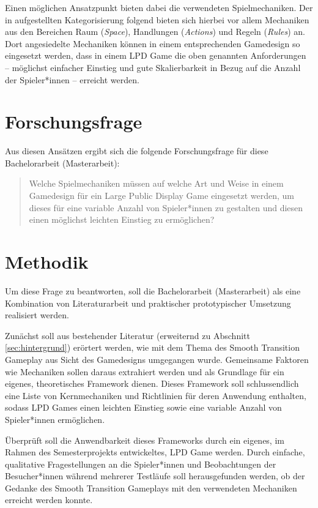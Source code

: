 Einen möglichen Ansatzpunkt bieten dabei die verwendeten Spielmechaniken. Der
in \cite{Schell2019} aufgestellten Kategorisierung folgend bieten sich hierbei 
vor allem Mechaniken aus den Bereichen Raum (\emph{Space}), Handlungen
(\emph{Actions}) und Regeln (\emph{Rules}) an. Dort angesiedelte Mechaniken
können in einem entsprechenden Gamedesign so eingesetzt werden, dass in einem
LPD Game die oben genannten Anforderungen -- möglichst einfacher Einstieg und
gute Skalierbarkeit in Bezug auf die Anzahl der Spieler*innen -- erreicht
werden.

\section{Forschungsfrage}

Aus diesen Ansätzen ergibt sich die folgende Forschungsfrage für diese
Bachelorarbeit (Masterarbeit):
%
\begin{quote}
	Welche Spielmechaniken müssen auf welche Art und Weise in einem
	Game\-design für ein Large Public Display Game eingesetzt werden, um
	dieses für eine variable Anzahl von Spieler*innen zu gestalten und diesen
	einen möglichst leichten Einstieg zu ermöglichen?
\end{quote}


\section{Methodik}

Um diese Frage zu beantworten, soll die Bachelorarbeit (Masterarbeit) als eine
Kombination von Literaturarbeit und praktischer \bzw prototypischer Umsetzung
realisiert werden.

Zunächst soll aus bestehender Literatur (erweiternd zu Abschnitt
\ref{sec:hintergrund}) erörtert werden, wie mit dem Thema des Smooth
Transition Gameplay aus Sicht des Gamedesigns umgegangen wurde. Gemeinsame
Faktoren wie Mechaniken sollen daraus extrahiert werden und als Grundlage für
ein eigenes, theoretisches Framework dienen. Dieses Framework soll
schlussendlich eine Liste von Kernmechaniken und Richtlinien für deren
Anwendung enthalten, sodass LPD Games einen leichten Einstieg sowie eine
variable Anzahl von Spieler*innen ermöglichen.

Überprüft soll die Anwendbarkeit dieses Frameworks durch ein eigenes, im
Rahmen des Semesterprojekts entwickeltes, LPD Game werden. Durch einfache,
qualitative Fragestellungen an die Spieler*innen und Beobachtungen der
Besucher*innen während mehrerer Testläufe soll herausgefunden werden, ob der
Gedanke des Smooth Transition Gameplays mit den verwendeten Mechaniken
erreicht werden konnte.


